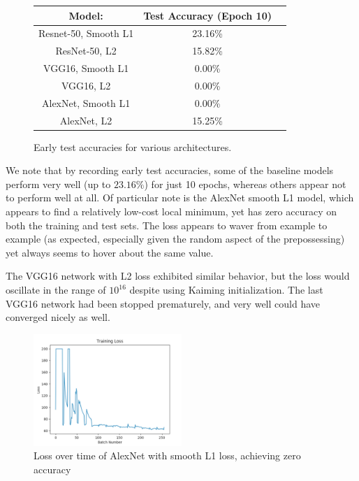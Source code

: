 \documentclass[10pt,twocolumn,letterpaper]{article}
\begin{document}
\begin{figure}
    \label{fig:table}
    \begin{center}
        \begin{tabular}{c|cc}
            \hline
            Model: & Test Accuracy (Epoch 10)\\
            \hline
            Resnet-50, Smooth L1 & 23.16\% \\
            \hline
            ResNet-50, L2 & 15.82\% \\
            \hline
            VGG16, Smooth L1 & 0.00\% \\
            \hline
            VGG16, L2 & 0.00\% \\
            \hline
            AlexNet, Smooth L1 & 0.00\% \\
            \hline
            AlexNet, L2 & 15.25\% \\
            \hline
            
        \end{tabular}
    \end{center}
    \caption{Early test accuracies for various architectures.}
\end{figure}

We note that by recording early test accuracies, some of the baseline models perform very well (up to $23.16\%$) for just 10 epochs, whereas others appear not to perform well at all. Of particular note is the AlexNet smooth L1 model, which appears to find a relatively low-cost local minimum, yet has zero accuracy on both the training and test sets. The loss appears to waver from example to example (as expected, especially given the random aspect of the prepossessing) yet always seems to hover about the same value. 

The VGG16 network with L2 loss exhibited similar behavior, but the loss would oscillate in the range of $10^{16}$ despite using Kaiming initialization. The last VGG16 network had been stopped prematurely, and very well could have converged nicely as well.

\begin{figure}
    \centering
    \includegraphics[width=0.5\textwidth]{images/lossovertime.png}
    \caption{Loss over time of AlexNet with smooth L1 loss, achieving zero accuracy}
\end{figure}
\end{document}
